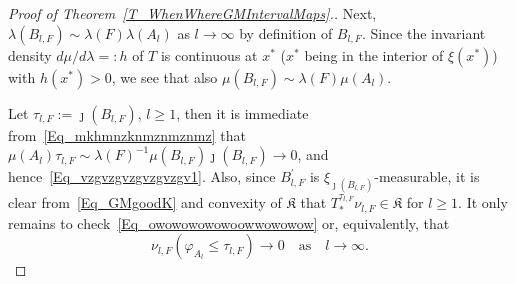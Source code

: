 \documentclass[AHL,Unicode,longabstracts]{cedram}
\newcommand{\frkK}{\mathfrak{K}}
\begin{document}
\begin{proof}[{Proof of Theorem~\ref{T_WhenWhereGMIntervalMaps}.}]
Next, $\lambda(B_{l,F})\sim\lambda(F)\lambda(A_{l})$ as $l\rightarrow\infty$ by definition of $B_{l,F}$. Since the invariant density $d\mu/d\lambda=:h$ of $T$ is continuous at $x^{\ast}$ ($x^{\ast}$ being in the interior of $\xi(x^{\ast})$) with $h(x^{\ast})>0$, we see that also $\mu(B_{l,F})\sim\lambda(F)\mu(A_{l})$.

Let $\tau_{l,F}:=\jmath(B_{l,F})$, $l\geq1$, then it is immediate from~\eqref{Eq_mkhmnzknmznmznmz} that $\mu(A_{l})\tau_{l,F}\sim\lambda(F)^{-1}
\mu(B_{l,F})\jmath(B_{l,F})\rightarrow0$, and hence~\eqref{Eq_vzgvzgvzgvzgvzgv1}. Also, since $B_{l,F}^{\prime}$ is $\xi _{\jmath(B_{l,F})}$-measura\-ble, it is clear from~\eqref{Eq_GMgoodK} and convexity of $\frkK$ that $T_{\ast}^{\tau_{l,F}}\nu_{l,F}
\in\frkK$ for $l\geq1$. It only remains to check~\eqref{Eq_owowowowowoowwowowow} or, equivalently, that
\begin{equation}\label{Eq_Wuhuhu}
\nu_{l,F}\left(\varphi_{A_{l}}\leq\tau_{l,F}\right) \longrightarrow 0\quad\text{as}\quad l\rightarrow\infty.
\end{equation}



\end{proof}
\end{document}
